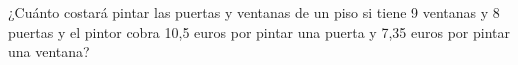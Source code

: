 \documentclass[addpoints,spanish, 12pt,a4paper]{exam}
\renewcommand*\half{.5}
\begin{document}
\begin{questions}

\question[2] ¿Cuánto costará pintar las puertas y ventanas de un piso si tiene 9 ventanas y 8 puertas y el pintor cobra 10,5 euros por pintar una puerta y 7,35 euros por pintar una ventana?\vspace{100pt}





    


\end{questions}
\end{document}
